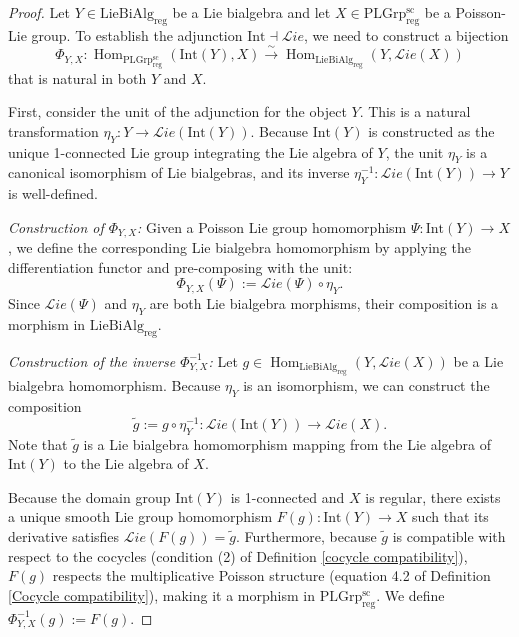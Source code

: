 \documentclass[11pt,reqno]{amsart}
\theoremstyle{definition}
\numberwithin{equation}{section}
\begin{document}
\begin{proof}

Let $Y \in \mathrm{LieBiAlg_{reg}}$ be a Lie bialgebra and let $X \in \mathrm{PLGrp_{reg}^{sc}}$ be a Poisson-Lie group. To establish the adjunction $\mathrm{Int} \dashv \mathcal{L}ie$, we need to  construct a bijection
$$ \Phi_{Y,X} : \operatorname{Hom}_{\mathrm{PLGrp_{reg}^{sc}}}(\mathrm{Int}(Y), X) \xrightarrow{\sim} \operatorname{Hom}_{\mathrm{LieBiAlg_{reg}}}(Y, \mathcal{L}ie(X)) $$
that is natural in both $Y$ and $X$. 

First, consider the unit of the adjunction for the object $Y$. This is a natural transformation $\eta_Y : Y \to \mathcal{L}ie(\mathrm{Int}(Y))$. Because $\mathrm{Int}(Y)$ is constructed as the unique 1-connected Lie group integrating the Lie algebra of $Y$, the unit $\eta_Y$ is a canonical isomorphism of Lie bialgebras, and its inverse $\eta_Y^{-1} : \mathcal{L}ie(\mathrm{Int}(Y)) \to Y$ is well-defined.

\textit{Construction of $\Phi_{Y,X}$:} 
Given a Poisson Lie group homomorphism $\Psi : \mathrm{Int}(Y) \to X$, we define the corresponding Lie bialgebra homomorphism by applying the differentiation functor and pre-composing with the unit:
$$ \Phi_{Y,X}(\Psi) := \mathcal{L}ie(\Psi) \circ \eta_Y. $$
Since $\mathcal{L}ie(\Psi)$ and $\eta_Y$ are both Lie bialgebra morphisms, their composition is a morphism in $\mathrm{LieBiAlg_{reg}}$.

\textit{Construction of the inverse $\Phi_{Y,X}^{-1}$:}
Let $g \in \operatorname{Hom}_{\mathrm{LieBiAlg_{reg}}}(Y, \mathcal{L}ie(X))$ be a Lie bialgebra homomorphism. Because $\eta_Y$ is an isomorphism, we can construct the composition
$$ \tilde{g} := g \circ \eta_Y^{-1} : \mathcal{L}ie(\mathrm{Int}(Y)) \to \mathcal{L}ie(X). $$
Note that $\tilde{g}$ is a Lie bialgebra homomorphism mapping from the Lie algebra of $\mathrm{Int}(Y)$ to the Lie algebra of $X$. 

Because the domain group $\mathrm{Int}(Y)$ is 1-connected and $X$ is regular, there exists a unique smooth Lie group homomorphism $F(g) : \mathrm{Int}(Y) \to X$ such that its derivative satisfies $\mathcal{L}ie(F(g)) = \tilde{g}$. Furthermore, because $\tilde{g}$ is compatible with respect to the cocycles (condition (2) of Definition \ref{cocycle compatibility}), $F(g)$ respects the multiplicative Poisson structure (equation 4.2 of Definition \ref{Cocycle compatibility}), making it a  morphism in $\mathrm{PLGrp_{reg}^{sc}}$. 
We define $\Phi_{Y,X}^{-1}(g) := F(g)$.
\end{proof}
\end{document}
